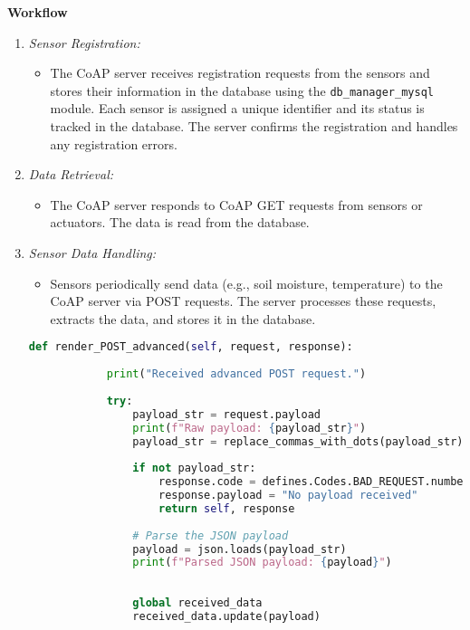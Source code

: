 \textbf{Workflow}
\begin{enumerate}
    \item \textit{Sensor Registration:} 
    \begin{itemize}
        \item The CoAP server receives registration requests from the sensors and stores their information in the database using the \texttt{db\_manager\_mysql} module. Each sensor is assigned a unique identifier and its status is tracked in the database. The server confirms the registration and handles any registration errors.
    \end{itemize}
    
    \item \textit{Data Retrieval:}
    \begin{itemize}
        \item The CoAP server responds to CoAP GET requests from sensors or actuators. The data is read from the database.
    \end{itemize}

    \item \textit{Sensor Data Handling:} 
    \begin{itemize}
        \item Sensors periodically send data (e.g., soil moisture, temperature) to the CoAP server via POST requests. The server processes these requests, extracts the data, and stores it in the database.
    \end{itemize}

    \begin{lstlisting}[language=Python]
        def render_POST_advanced(self, request, response):
            
            print("Received advanced POST request.")
            
            try:
                payload_str = request.payload
                print(f"Raw payload: {payload_str}")
                payload_str = replace_commas_with_dots(payload_str)
        
                if not payload_str:
                    response.code = defines.Codes.BAD_REQUEST.number
                    response.payload = "No payload received"
                    return self, response
        
                # Parse the JSON payload
                payload = json.loads(payload_str)
                print(f"Parsed JSON payload: {payload}")
        
                
                global received_data
                received_data.update(payload)
        \end{lstlisting}
    

\end{enumerate}
